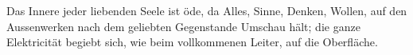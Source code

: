 Das Innere jeder liebenden Seele ist öde, da Alles, Sinne, Denken, Wollen, auf den Aussenwerken nach dem geliebten Gegenstande Umschau hält; die ganze Elektricität begiebt sich, wie beim vollkommenen Leiter, auf die Oberfläche.
\par

